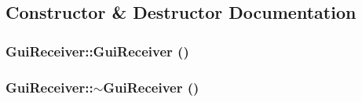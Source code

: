 \subsection{Constructor \& Destructor Documentation}
\hypertarget{classGuiReceiver_a0f840f04f1834a394fceeeca7dd88827}{
\subsubsection[{GuiReceiver}]{\setlength{\rightskip}{0pt plus 5cm}GuiReceiver::GuiReceiver ()}}
\label{classGuiReceiver_a0f840f04f1834a394fceeeca7dd88827}
\hypertarget{classGuiReceiver_a7655140d1defb2adb481eab40193fd97}{
\subsubsection[{$\sim$GuiReceiver}]{\setlength{\rightskip}{0pt plus 5cm}GuiReceiver::$\sim$GuiReceiver ()}}
\label{classGuiReceiver_a7655140d1defb2adb481eab40193fd97}


